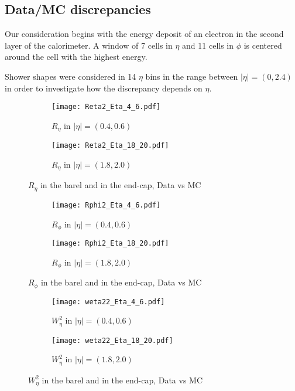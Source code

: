   \subsection{Data/MC discrepancies}
  Our consideration begins with the energy deposit of an electron in the second layer of the calorimeter. A window of 7 cells in $\eta$ and 11 cells in $\phi$ is centered around the cell with the highest energy.

  Shower shapes were considered in 14 $\eta$ bins in the range between $|\eta| = (0,2.4)$ in order to investigate how the discrepancy depends on $\eta$. 
    	\begin{figure}[htbp]
  	\begin{subfigure}[t]{0.5\textwidth}
  		\texttt{[image: Reta2\_Eta\_4\_6.pdf]}
  		\caption{$R_{\eta}$ in $|\eta| = (0.4,0.6)$ }
  		\label{fig::reta_norew_04}
  	\end{subfigure}
  	\hfill
  	\begin{subfigure}[t]{0.5\textwidth} 
  		\texttt{[image: Reta2\_Eta\_18\_20.pdf]}
  		\caption{$R_{\eta}$ in $|\eta| = (1.8,2.0)$ }
  		\label{fig::reta_norew_18}
  	\end{subfigure}
  	\caption{$R_{\eta}$ in the barel and in the end-cap, Data vs MC}
  	\label{fig::reta_norew}
  \end{figure}

    \begin{figure}[htbp]
	\begin{subfigure}[t]{0.5\textwidth}
		\texttt{[image: Rphi2\_Eta\_4\_6.pdf]}
		\caption{$R_{\phi}$ in $|\eta| = (0.4,0.6)$ }
		\label{fig::rphi_norew_04}
	\end{subfigure}
	\hfill
	\begin{subfigure}[t]{0.5\textwidth} 
		\texttt{[image: Rphi2\_Eta\_18\_20.pdf]}
		\caption{$R_{\phi}$ in $|\eta| = (1.8,2.0)$ }
		\label{fig::rphi_norew_18}
	\end{subfigure}
	\caption{$R_{\phi}$ in the barel and in the end-cap, Data vs MC}
	\label{fig::rphi_norew}
\end{figure}
  
    \begin{figure}[htbp]
	\begin{subfigure}[t]{0.5\textwidth}
		\texttt{[image: weta22\_Eta\_4\_6.pdf]}
		\caption{$W_{\eta}^2$ in $|\eta| = (0.4,0.6)$ }
		\label{fig::weta2_norew_04}
	\end{subfigure}
	\hfill
	\begin{subfigure}[t]{0.5\textwidth} 
		\texttt{[image: weta22\_Eta\_18\_20.pdf]}
		\caption{$W_{\eta}^2$ in $|\eta| = (1.8,2.0)$ }
		\label{fig::weta2_norew_18}
	\end{subfigure}
	\caption{$W_{\eta}^2$ in the barel and in the end-cap, Data vs MC}
	\label{fig::weta2_norew}
\end{figure}



